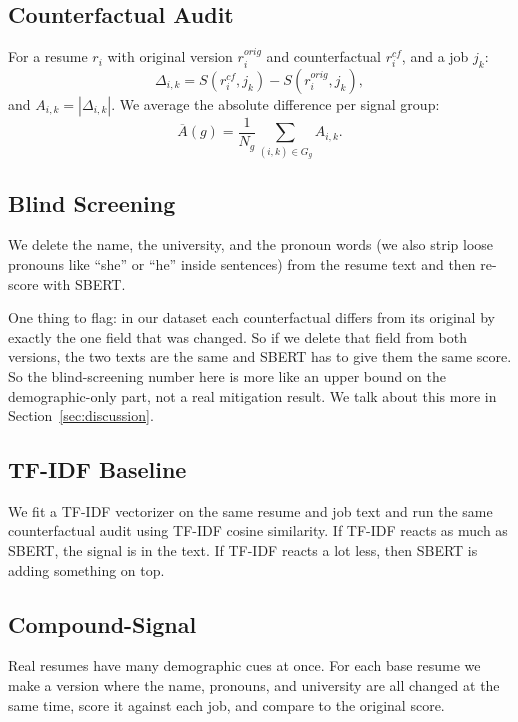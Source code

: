 \documentclass{article}
\begin{document}
\subsection{Counterfactual Audit}

For a resume $r_i$ with original version $r_i^{orig}$ and counterfactual $r_i^{cf}$, and a job $j_k$:
\begin{equation}
\Delta_{i,k} = S(r_i^{cf}, j_k) - S(r_i^{orig}, j_k),
\end{equation}
and $A_{i,k} = |\Delta_{i,k}|$. We average the absolute difference per signal group:
\begin{equation}
\overline{A}(g) = \frac{1}{N_g} \sum_{(i,k)\in G_g} A_{i,k}.
\end{equation}

\subsection{Blind Screening}
\label{sec:blind_method}

We delete the name, the university, and the pronoun words (we also strip loose pronouns like ``she'' or ``he'' inside sentences) from the resume text and then re-score with SBERT.

One thing to flag: in our dataset each counterfactual differs from its original by exactly the one field that was changed. So if we delete that field from both versions, the two texts are the same and SBERT has to give them the same score. So the blind-screening number here is more like an upper bound on the demographic-only part, not a real mitigation result. We talk about this more in Section~\ref{sec:discussion}.

\subsection{TF-IDF Baseline}

We fit a TF-IDF vectorizer on the same resume and job text and run the same counterfactual audit using TF-IDF cosine similarity. If TF-IDF reacts as much as SBERT, the signal is in the text. If TF-IDF reacts a lot less, then SBERT is adding something on top.

\subsection{Compound-Signal}
\label{sec:compound}

Real resumes have many demographic cues at once. For each base resume we make a version where the name, pronouns, and university are all changed at the same time, score it against each job, and compare to the original score.
\end{document}

